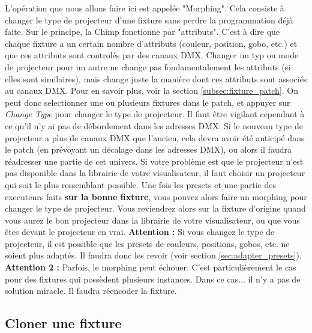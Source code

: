 L'opération que nous allons faire ici est appelée "Morphing". Cela consiste à changer le type de projecteur d'une fixture sans perdre la programmation déjà faite.
\newline
Sur le principe, la Chimp fonctionne par "attributs". C'est à dire que chaque fixture a un certain nombre d'attributs (couleur, position, gobo, etc.) et que ces attributs sont controlés par des canaux DMX.
Changer un typ ou mode de projecteur pour un autre ne change pas fondamentalement les attributs (si elles sont similaires), mais change juste la manière dont ces attributs sont associés au canaux DMX.
Pour en savoir plus, voir la section \ref{subsec:fixture_patch}.
\newline
On peut donc selectionner une ou plusieurs fixtures dans le patch, et appuyer sur \textit{Change Type} pour changer le type de projecteur.
Il faut être vigilant cependant à ce qu'il n'y ai pas de débordement dans les adresses DMX. Si le nouveau type de projecteur a plus de canaux DMX que l'ancien, cela devra avoir été anticipé dans le patch (en prévoyant un décalage dans les adresses DMX),
ou alors il faudra réadresser une partie de cet univers.
\newline
\newline
Si votre problème est que le projecteur n'est pas disponible dans la librairie de votre visualisateur, il faut choisir un projecteur qui soit le plus ressemblant possible. Une fois les presets et une partie des executeurs faits \textbf{sur la bonne fixture}, vous pouvez alors faire un morphing pour changer le type de projecteur.
Vous reviendrez alors sur la fixture d'origine quand vous aurez le bon projecteur dans la librairie de votre visualisateur, ou que vous êtes devant le projecteur en vrai.
\newline
\newline
\textbf{Attention :} Si vous changez le type de projecteur, il est possible que les presets de couleurs, positions, gobos, etc. ne soient plus adaptés. Il faudra donc les revoir (voir section \ref{sec:adapter_presets}).
\newline
\textbf{Attention 2 :} Parfois, le morphing peut échouer. C'est particulièrement le cas pour des fixtures qui possèdent plusieurs instances. Dans ce cas$\dots$ il n'y a pas de solution miracle. Il faudra réencoder la fixture.

\subsection{Cloner une fixture}
\label{subsec:cloner_fixture}

